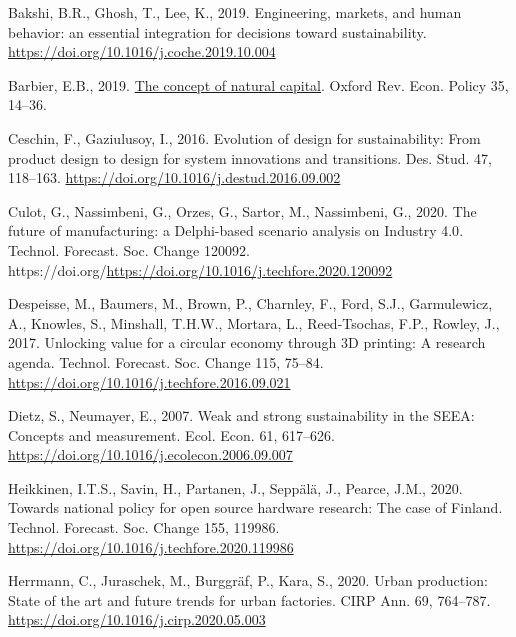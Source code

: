 \documentclass[
  12pt,
  oneside]{book}
\newlength{\cslhangindent}
\newlength{\cslentryspacingunit} %
\newenvironment{CSLReferences}[2] %
 {%
  \setlength{\parindent}{0pt}
  \ifodd #1
  \let\oldpar\par
  \def\par{\hangindent=\cslhangindent\oldpar}
  \fi
  \setlength{\parskip}{#2\cslentryspacingunit}
 }%
 {}
\begin{document}
\hypertarget{refs}{}
\begin{CSLReferences}{1}{0}
\leavevmode{}%
Bakshi, B.R., Ghosh, T., Lee, K., 2019. {Engineering, markets, and human behavior: an essential integration for decisions toward sustainability}. \url{https://doi.org/10.1016/j.coche.2019.10.004}

\leavevmode{}%
Barbier, E.B., 2019. \href{https://academic.oup.com/oxrep/article/35/1/14/5267896}{{The concept of natural capital}}. Oxford Rev. Econ. Policy 35, 14--36.

\leavevmode{}%
Ceschin, F., Gaziulusoy, I., 2016. {Evolution of design for sustainability: From product design to design for system innovations and transitions}. Des. Stud. 47, 118--163. \url{https://doi.org/10.1016/j.destud.2016.09.002}

\leavevmode{}%
Culot, G., Nassimbeni, G., Orzes, G., Sartor, M., Nassimbeni, G., 2020. {The future of manufacturing: a Delphi-based scenario analysis on Industry 4.0}. Technol. Forecast. Soc. Change 120092. https://doi.org/\url{https://doi.org/10.1016/j.techfore.2020.120092}

\leavevmode{}%
Despeisse, M., Baumers, M., Brown, P., Charnley, F., Ford, S.J., Garmulewicz, A., Knowles, S., Minshall, T.H.W., Mortara, L., Reed-Tsochas, F.P., Rowley, J., 2017. {Unlocking value for a circular economy through 3D printing: A research agenda}. Technol. Forecast. Soc. Change 115, 75--84. \url{https://doi.org/10.1016/j.techfore.2016.09.021}

\leavevmode{}%
Dietz, S., Neumayer, E., 2007. {Weak and strong sustainability in the SEEA: Concepts and measurement}. Ecol. Econ. 61, 617--626. \url{https://doi.org/10.1016/j.ecolecon.2006.09.007}

\leavevmode{}%
Heikkinen, I.T.S., Savin, H., Partanen, J., Seppälä, J., Pearce, J.M., 2020. {Towards national policy for open source hardware research: The case of Finland}. Technol. Forecast. Soc. Change 155, 119986. \url{https://doi.org/10.1016/j.techfore.2020.119986}

\leavevmode{}%
Herrmann, C., Juraschek, M., Burggräf, P., Kara, S., 2020. {Urban production: State of the art and future trends for urban factories}. CIRP Ann. 69, 764--787. \url{https://doi.org/10.1016/j.cirp.2020.05.003}


\end{CSLReferences}
\end{document}
